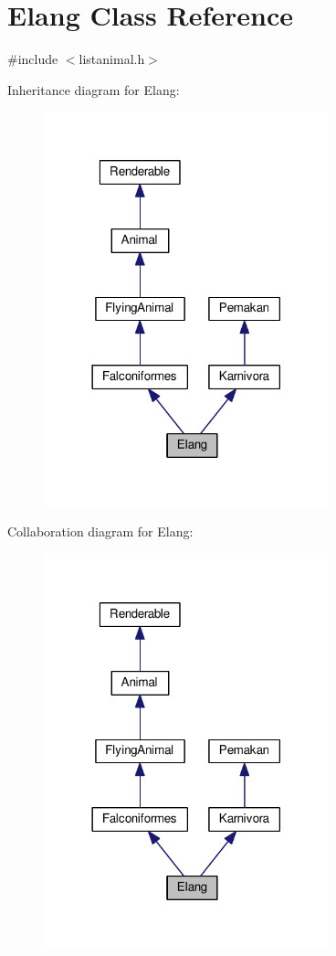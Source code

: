 \hypertarget{classElang}{}\section{Elang Class Reference}
\label{classElang}


{\ttfamily \#include $<$listanimal.\+h$>$}



Inheritance diagram for Elang\+:
\nopagebreak
\begin{figure}[H]
\begin{center}
\leavevmode
\includegraphics[width=234pt]{classElang__inherit__graph}
\end{center}
\end{figure}


Collaboration diagram for Elang\+:
\nopagebreak
\begin{figure}[H]
\begin{center}
\leavevmode
\includegraphics[width=234pt]{classElang__coll__graph}
\end{center}
\end{figure}
